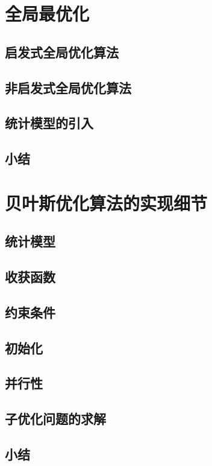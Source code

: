 \documentclass[index]{subfiles}
\begin{document}
\section{全局最优化}
\subsection{启发式全局优化算法}
\subsection{非启发式全局优化算法}
\subsection{统计模型的引入}
\subsection{小结}
\section{贝叶斯优化算法的实现细节}
\subsection{统计模型}
\subsection{收获函数}
\subsection{约束条件}
\subsection{初始化}\label{ssec:bgo-init}
\subsection{并行性}
\subsection{子优化问题的求解}
\subsection{小结}
\end{document}
